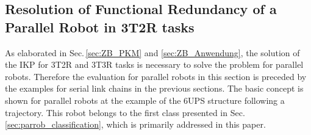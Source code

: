 \documentclass[robotics,article,submit,moreauthors,pdftex]{Definitions/mdpi}
\newcommand{\bm}[1]{\boldsymbol{#1}}
\newcommand{\transp}[0]{{\mathrm{T}}}
\begin{document}
\subsection{Resolution of Functional Redundancy of a Parallel Robot in 3T2R tasks}
\label{sec:Ergebnisse_IK_Parallel}


As elaborated in Sec.\,\ref{sec:ZB_PKM} and \ref{sec:ZB_Anwendung}, the solution of the IKP for 3T2R and 3T3R tasks is necessary to solve the problem for parallel robots.
Therefore the evaluation for parallel robots in this section is preceded by the examples for serial link chains in the previous sections.
The basic concept is shown for parallel robots at the example of the 6UPS structure following a trajectory.
This robot belongs to the first class presented in Sec.\,\ref{sec:parrob_classification}, which is primarily addressed in this paper.

\end{document}
